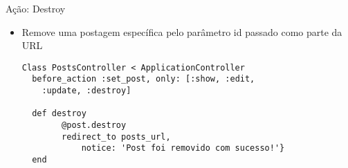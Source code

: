 \begin{frame}{Ação: Destroy}
	\begin{itemize}
		\item Remove uma postagem específica pelo parâmetro \alert{id} passado como parte da URL
		\begin{lstlisting}[style=RubyInputStyle, caption=posts\_controller.rb]
Class PostsController < ApplicationController
  before_action :set_post, only: [:show, :edit, 
  	:update, :destroy]

  def destroy
		@post.destroy
		redirect_to posts_url, 
			notice: 'Post foi removido com sucesso!'} 
  end 
		\end{lstlisting}		
	\end{itemize}	
\end{frame}
